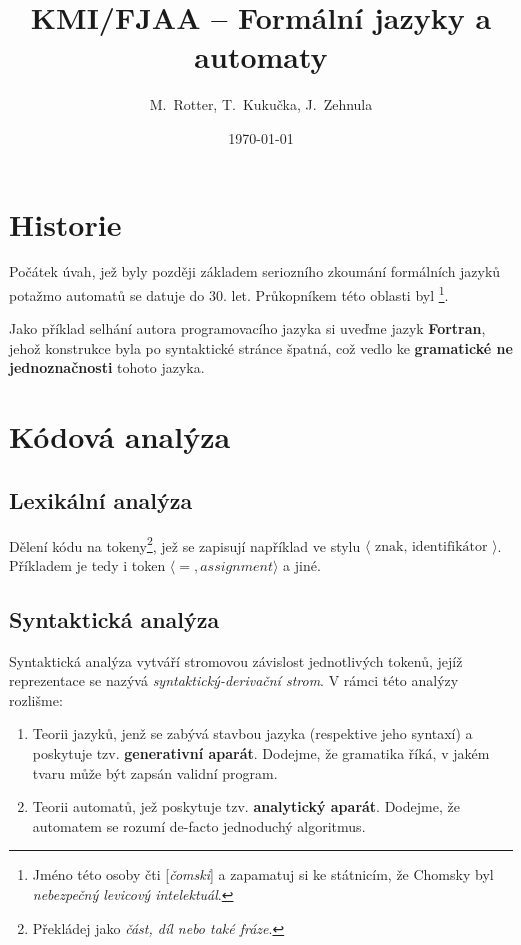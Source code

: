 \documentclass[10pt, a4paper, titlepage]{article}
\title{KMI/FJAA  -- Formální jazyky a automaty}
\author{M.~Rotter, T.~Kukučka, J.~Zehnula}
\date{\today}
\theoremstyle{note}
\begin{document}
\maketitle

\section{Historie}
Počátek úvah, jež byly později základem seriozního zkoumání formálních jazyků potažmo automatů se datuje do 30. let.
Průkopníkem této oblasti byl 
\footnote{Jméno této osoby čti [\emph{čomski}] a zapamatuj si ke státnicím, že Chomsky byl \emph{nebezpečný levicový intelektuál}.}.

Jako příklad selhání autora programovacího jazyka si uveďme jazyk \textbf{Fortran}, jehož konstrukce byla po syntaktické stránce špatná,
což vedlo ke \textbf{gramatické ne jednoznačnosti} tohoto jazyka.

\section{Kódová analýza}
\subsection{Lexikální analýza}
Dělení kódu na tokeny\footnote{Překládej jako \emph{část, díl nebo také fráze}.}, jež se zapisují například ve stylu
$\langle\text{ znak, identifikátor }\rangle$.
Příkladem je tedy i token $\langle =, assignment \rangle$ a jiné.

\subsection{Syntaktická analýza}
Syntaktická analýza vytváří stromovou závislost jednotlivých tokenů, jejíž reprezentace se nazývá \emph{syntaktický-derivační strom}.
V rámci této analýzy rozlišme:
\begin{enumerate}
\item
Teorii jazyků, jenž se zabývá stavbou jazyka (respektive jeho syntaxí) a poskytuje tzv. \textbf{generativní aparát}.
Dodejme, že gramatika říká, v jakém tvaru může být zapsán validní program.

\item
Teorii automatů, jež poskytuje tzv. \textbf{analytický aparát}.
Dodejme, že automatem se rozumí de-facto jednoduchý algoritmus.
\end{enumerate}
\end{document}
